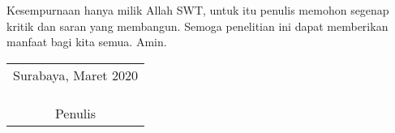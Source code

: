 Kesempurnaan hanya milik Allah SWT, untuk itu penulis memohon segenap kritik dan saran yang  membangun. Semoga penelitian ini dapat memberikan manfaat bagi kita semua. Amin.
\vspace{26pt}

\begin{flushright}
	\begin{tabular}[b]{c}
		Surabaya, Maret 2020
		\\
		\\
		\\
		\\
		Penulis
	\end{tabular}
\end{flushright}